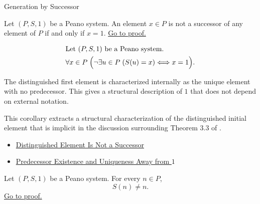 \begin{topicbox}{Generation by Successor}
\begin{tcolorbox}[colback=corbox, colframe=corborder, arc=2pt,
  left=6pt, right=6pt, top=4pt, bottom=4pt,
  title={\small\textbf{Corollary (The Distinguished Element Is the Unique Non-Successor)}} ,
  fonttitle=\small\bfseries]
\begin{corollary}
\label{cor:one-is-unique-non-successor}
Let $(P,S,1)$ be a Peano system. An element $x \in P$ is not a successor of
any element of $P$ if and only if $x=1$.
\hyperref[prf:one-is-unique-non-successor]{Go to proof.}
\end{corollary}
\end{tcolorbox}

\begin{remark*}
\[
\begin{aligned}
&\text{Let } (P,S,1) \text{ be a Peano system.}\\
&\forall x \in P\;\Bigl(\neg\exists u \in P\;(S(u)=x) \Longleftrightarrow x=1\Bigr).
\end{aligned}
\]
\end{remark*}

\begin{remark*}[Interpretation]
The distinguished first element is characterized internally as the unique
element with no predecessor. This gives a structural description of $1$ that
does not depend on external notation.
\end{remark*}

\begin{remark*}
This corollary extracts a structural characterization of the distinguished
initial element that is implicit in the discussion surrounding Theorem 3.3 of
\citet{FefermanNumberSystems1964}.
\end{remark*}

\begin{remark*}[Dependencies]
\begin{itemize}
  \item \hyperref[ax:peano-one-not-successor]{Distinguished Element Is Not a Successor}
  \item \hyperref[cor:predecessor-exists-unique-away-from-one]{Predecessor Existence and Uniqueness Away from $1$}
\end{itemize}
\end{remark*}

\begin{tcolorbox}[colback=thmbox, colframe=thmborder, arc=2pt,
  left=6pt, right=6pt, top=4pt, bottom=4pt,
  title={\small\textbf{Theorem (No Object Is Its Own Successor)}} ,
  fonttitle=\small\bfseries]
\begin{theorem}
\label{thm:no-object-is-its-own-successor}
Let $(P,S,1)$ be a Peano system. For every $n \in P$,
\[
S(n) \neq n.
\]
\hyperref[prf:no-object-is-its-own-successor]{Go to proof.}
\end{theorem}
\end{tcolorbox}


\end{topicbox}
